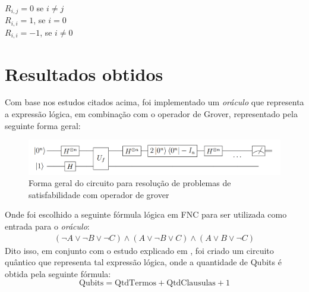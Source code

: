 \documentclass[12pt]{article}
\begin{document}
$R_{i,j} = 0$ se $i \neq j$ \\

$R_{i,i} = 1$, se $i = 0$ \\

$R_{i,i} = -1$, se $i \neq 0$ \\



\section{Resultados obtidos}

Com base nos estudos citados acima, foi implementado um \textit{\textit{oráculo}} que representa a expressão lógica, em combinação com o operador de Grover, representado pela seguinte forma geral:
\begin{figure}[h]
\centering
\includegraphics[width=1\textwidth]{portilheiro_forma_geral.png}
\caption{Forma geral do circuito para resolução de problemas de satisfabilidade com operador de grover \textbf{\cite{portilheiro:18}}}
\label{fig:forma_geral}
\end{figure}

Onde foi escolhido a seguinte fórmula lógica em FNC para ser utilizada como entrada para o \textit{oráculo}:
\begin{equation*}
\begin{aligned}
    (\neg A \lor \neg B \lor \neg C) \land (A \lor \neg B \lor C) \land (A \lor B \lor \neg C)
\end{aligned}
\end{equation*}
Dito isso, em conjunto com o estudo explicado em \textbf{\cite{portilheiro:18}}, foi criado um circuito quântico que representa tal expressão lógica, onde a quantidade de Qubits é obtida pela seguinte fórmula:
\begin{equation*}
\text{Qubits} = \text{QtdTermos} + \text{QtdClausulas} + 1
\end{equation*}
\end{document}
